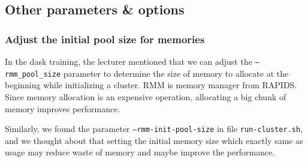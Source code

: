 \documentclass{article}
\begin{document}




\subsection{Other parameters \& options}

\subsubsection{Adjust the initial pool size for memories}

In the dask training, the lecturer mentioned that we can adjust the \texttt{--rmm\_pool\_size} parameter to determine the size of memory to allocate at the beginning while initializing a cluster. \textsf{RMM} is memory manager from \textsf{RAPIDS}. Since memory allocation is an expensive operation, allocating a big chunk of memory improves performance.

Similarly, we found the parameter \texttt{--rmm-init-pool-size} in file \texttt{run-cluster.sh}, and we thought about that setting the initial memory size which exactly same as usage may reduce waste of memory and maybe improve the performance.
\end{document}
